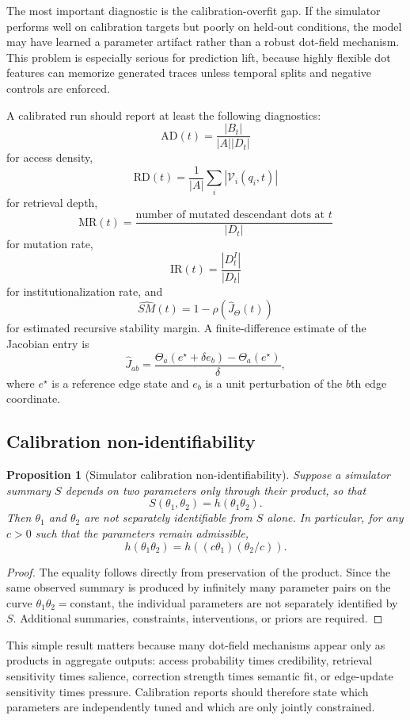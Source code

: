 \documentclass[11pt]{article}
\newtheorem{proposition}{Proposition}
\theoremstyle{remark}
\begin{document}
The most important diagnostic is the calibration-overfit gap. If the simulator performs well on calibration targets but poorly on held-out conditions, the model may have learned a parameter artifact rather than a robust dot-field mechanism. This problem is especially serious for prediction lift, because highly flexible dot features can memorize generated traces unless temporal splits and negative controls are enforced.


A calibrated run should report at least the following diagnostics:
\[
\mathrm{AD}(t)=\frac{|B_t|}{|A||D_t|}
\]
for access density,
\[
\mathrm{RD}(t)=\frac{1}{|A|}\sum_i |\mathcal V_i(q_i,t)|
\]
for retrieval depth,
\[
\mathrm{MR}(t)=\frac{\text{number of mutated descendant dots at }t}{|D_t|}
\]
for mutation rate,
\[
\mathrm{IR}(t)=\frac{|D_t^I|}{|D_t|}
\]
for institutionalization rate, and
\[
\widehat{SM}(t)=1-\rho(\widehat J_\Theta(t))
\]
for estimated recursive stability margin. A finite-difference estimate of the Jacobian entry is
\[
\widehat J_{ab}=\frac{\Theta_a(e^\star+\delta e_b)-\Theta_a(e^\star)}{\delta},
\]
where $e^\star$ is a reference edge state and $e_b$ is a unit perturbation of the $b$th edge coordinate.

\subsection{Calibration non-identifiability}\label{calibration-non-identifiability}

\begin{proposition}[Simulator calibration non-identifiability]
Suppose a simulator summary $S$ depends on two parameters only through their product, so that
\[
S(\theta_1,\theta_2)=h(\theta_1\theta_2).
\]
Then $\theta_1$ and $\theta_2$ are not separately identifiable from $S$ alone. In particular, for any $c>0$ such that the parameters remain admissible,
\[
h(\theta_1\theta_2)=h((c\theta_1)(\theta_2/c)).
\]
\end{proposition}

\begin{proof}
The equality follows directly from preservation of the product. Since the same observed summary is produced by infinitely many parameter pairs on the curve $\theta_1\theta_2=\mathrm{constant}$, the individual parameters are not separately identified by $S$. Additional summaries, constraints, interventions, or priors are required.
\end{proof}

This simple result matters because many dot-field mechanisms appear only as products in aggregate outputs: access probability times credibility, retrieval sensitivity times salience, correction strength times semantic fit, or edge-update sensitivity times pressure. Calibration reports should therefore state which parameters are independently tuned and which are only jointly constrained.
\end{document}
